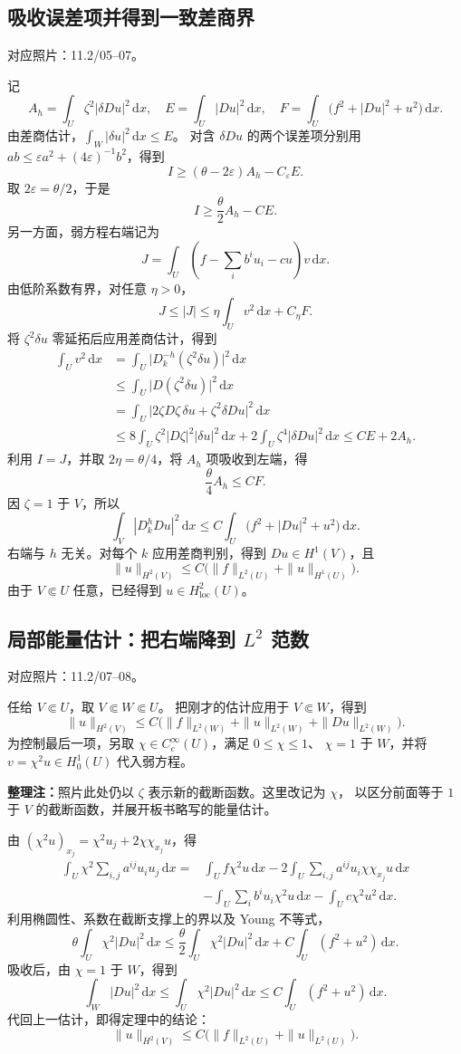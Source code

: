 \documentclass[UTF8,a4paper,11pt,fontset=fandol]{ctexart}
\newcommand{\dd}{\,\mathrm d}
\newcommand{\ednote}[1]{\par{\small\color{notegray}\textbf{整理注：}#1}\par}
\newcommand{\source}[1]{{\small\color{notegray}对应照片：#1。}\par}
\begin{document}
\subsection{吸收误差项并得到一致差商界}
\source{11.2/05--07}
记
\[
A_h=\int_U\zeta^2|\delta Du|^2\dd x,\quad
E=\int_U|Du|^2\dd x,\quad
F=\int_U\bigl(f^2+|Du|^2+u^2\bigr)\dd x.
\]
由差商估计，$\int_W|\delta u|^2\dd x\leq E$。
对含 $\delta Du$ 的两个误差项分别用
$ab\leq\varepsilon a^2+(4\varepsilon)^{-1}b^2$，得到
\[
I\geq(\theta-2\varepsilon)A_h-C_\varepsilon E.
\]
取 $2\varepsilon=\theta/2$，于是
\[
\boxed{I\geq\frac\theta2 A_h-CE.}
\]
另一方面，弱方程右端记为
\[
J=\int_U\left(f-\sum_i b^iu_i-cu\right)v\dd x.
\]
由低阶系数有界，对任意 $\eta>0$，
\[
J\leq |J|\leq\eta\int_Uv^2\dd x+C_\eta F.
\]
将 $\zeta^2\delta u$ 零延拓后应用差商估计，得到
\[
\begin{aligned}
\int_Uv^2\dd x
&=\int_U\bigl|D_k^{-h}(\zeta^2\delta u)\bigr|^2\dd x\\
&\leq\int_U\bigl|D(\zeta^2\delta u)\bigr|^2\dd x\\
&=\int_U\bigl|2\zeta D\zeta\,\delta u+\zeta^2\delta Du\bigr|^2\dd x\\
&\leq 8\int_U\zeta^2|D\zeta|^2|\delta u|^2\dd x
      +2\int_U\zeta^4|\delta Du|^2\dd x
\leq CE+2A_h.
\end{aligned}
\]
利用 $I=J$，并取 $2\eta=\theta/4$，将 $A_h$ 项吸收到左端，得
\[
\frac\theta4 A_h\leq CF.
\]
因 $\zeta=1$ 于 $V$，所以
\[
\boxed{\int_V|D_k^hDu|^2\dd x
\leq C\int_U\bigl(f^2+|Du|^2+u^2\bigr)\dd x.}
\]
右端与 $h$ 无关。对每个 $k$ 应用差商判别，得到 $Du\in H^1(V)$，且
\[
\|u\|_{H^2(V)}\leq C\bigl(\|f\|_{L^2(U)}+\|u\|_{H^1(U)}\bigr).
\]
由于 $V\Subset U$ 任意，已经得到 $u\in H_{\mathrm{loc}}^2(U)$。

\newpage
\subsection{\texorpdfstring{局部能量估计：把右端降到 $L^2$ 范数}{局部能量估计：把右端降到 L² 范数}}
\source{11.2/07--08}
任给 $V\Subset U$，取 $V\Subset W\Subset U$。
把刚才的估计应用于 $V\Subset W$，得到
\[
\|u\|_{H^2(V)}\leq C\bigl(\|f\|_{L^2(W)}
 +\|u\|_{L^2(W)}+\|Du\|_{L^2(W)}\bigr).
\]
为控制最后一项，另取 $\chi\in C_c^\infty(U)$，满足 $0\leq\chi\leq1$、
$\chi=1$ 于 $W$，并将 $v=\chi^2u\in H_0^1(U)$ 代入弱方程。
\ednote{照片此处仍以 $\zeta$ 表示新的截断函数。这里改记为 $\chi$，
以区分前面等于 $1$ 于 $V$ 的截断函数，并展开板书略写的能量估计。}
由 $(\chi^2u)_{x_j}=\chi^2u_j+2\chi\chi_{x_j}u$，得
\[
\begin{aligned}
\int_U\chi^2\sum_{i,j}a^{ij}u_i u_j\dd x
={}&\int_U f\chi^2u\dd x
-2\int_U\sum_{i,j}a^{ij}u_i\chi\chi_{x_j}u\dd x\\
&-\int_U\sum_i b^iu_i\chi^2u\dd x
-\int_U c\chi^2u^2\dd x.
\end{aligned}
\]
利用椭圆性、系数在截断支撑上的界以及 Young 不等式，
\[
\theta\int_U\chi^2|Du|^2\dd x
\leq\frac\theta2\int_U\chi^2|Du|^2\dd x
 +C\int_U(f^2+u^2)\dd x.
\]
吸收后，由 $\chi=1$ 于 $W$，得到
\[
\int_W|Du|^2\dd x\leq\int_U\chi^2|Du|^2\dd x
\leq C\int_U(f^2+u^2)\dd x.
\]
代回上一估计，即得定理中的结论：
\[
\boxed{\|u\|_{H^2(V)}\leq C\bigl(\|f\|_{L^2(U)}+\|u\|_{L^2(U)}\bigr).}
\]
\end{document}
